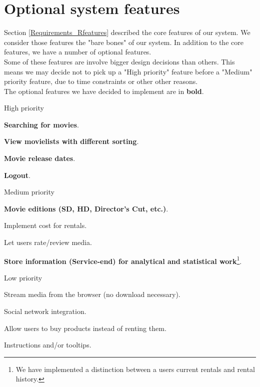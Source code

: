 \section{Optional system features}
\label{Requirements_Ofeatures}
Section \ref{Requirements_Rfeatures} described the core features of our system. We consider those features the "bare bones" of our system. In addition to the core features, we have a number of optional features. 
\\Some of these features are involve bigger design decisions than others. This means we may decide not to pick up a "High priority" feature before a "Medium" priority feature, due to time constraints or other other reasons.
\\The optional features we have decided to implement are in \textbf{bold}.
\begin{my_itemize}
	\item High priority
	\begin{my_itemize}
		\item \textbf{Searching for movies}.
		\item \textbf{View movielists with different sorting}.
		\item \textbf{Movie release dates}.
		\item \textbf{Logout}.
	\end{my_itemize}
	\item Medium priority
	\begin{my_itemize}
		\item \textbf{Movie editions (SD, HD, Director's Cut, etc.)}.
		\item Implement cost for rentals.
		\item Let users rate/review media.
		\item \textbf{Store information (Service-end) for analytical and statistical work}\footnote{We have implemented a distinction between a users current rentals and rental history.}.
	\end{my_itemize}
	\item Low priority
	\begin{my_itemize}
		\item Stream media from the browser (no download necessary).
		\item Social network integration.
		\item Allow users to buy products instead of renting them.
		\item Instructions and/or tooltips.
	\end{my_itemize}
\end{my_itemize}

